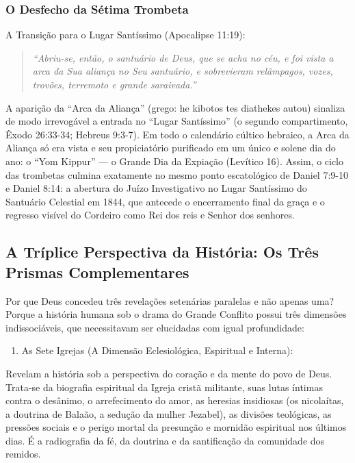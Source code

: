 \documentclass[11pt,a4paper,openany]{book}
\begin{document}
\subsubsection*{O Desfecho da Sétima Trombeta}
A Transição para o Lugar Santíssimo (Apocalipse 11:19):

\begin{quote}
\itshape ``Abriu-se, então, o santuário de Deus, que se acha no céu, e foi vista a arca da Sua aliança no Seu santuário, e sobrevieram relâmpagos, vozes, trovões, terremoto e grande saraivada.''
\end{quote}

A aparição da ``Arca da Aliança'' (grego: he kibotos tes diathekes autou) sinaliza de modo irrevogável a entrada no ``Lugar Santíssimo'' (o segundo compartimento, Êxodo 26:33-34; Hebreus 9:3-7). Em todo o calendário cúltico hebraico, a Arca da Aliança só era vista e seu propiciatório purificado em um único e solene dia do ano: o ``Yom Kippur'' — o Grande Dia da Expiação (Levítico 16). Assim, o ciclo das trombetas culmina exatamente no mesmo ponto escatológico de Daniel 7:9-10 e Daniel 8:14: a abertura do Juízo Investigativo no Lugar Santíssimo do Santuário Celestial em 1844, que antecede o encerramento final da graça e o regresso visível do Cordeiro como Rei dos reis e Senhor dos senhores.



\subsection{A Tríplice Perspectiva da História: Os Três Prismas Complementares}


Por que Deus concedeu três revelações setenárias paralelas e não apenas uma? Porque a história humana sob o drama do Grande Conflito possui três dimensões indissociáveis, que necessitavam ser elucidadas com igual profundidade:

\begin{enumerate}
  \item As Sete Igrejas (A Dimensão Eclesiológica, Espiritual e Interna):
\end{enumerate}

Revelam a história sob a perspectiva do coração e da mente do povo de Deus. Trata-se da biografia espiritual da Igreja cristã militante, suas lutas íntimas contra o desânimo, o arrefecimento do amor, as heresias insidiosas (os nicolaítas, a doutrina de Balaão, a sedução da mulher Jezabel), as divisões teológicas, as pressões sociais e o perigo mortal da presunção e mornidão espiritual nos últimos dias. É a radiografia da fé, da doutrina e da santificação da comunidade dos remidos.
\end{document}
